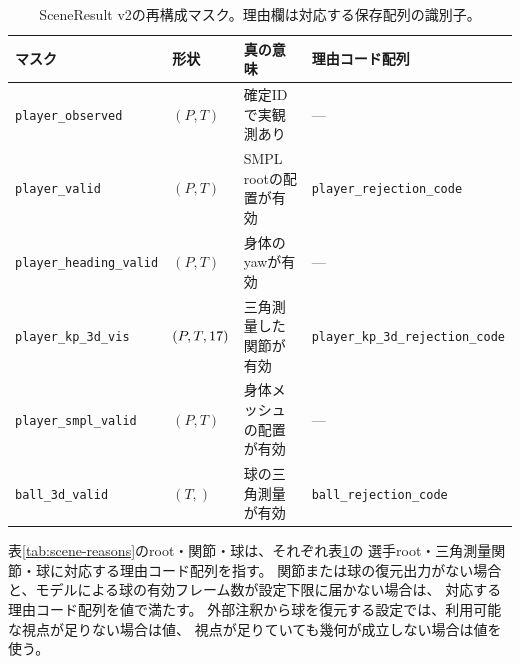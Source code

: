 \begin{table}[htbp]
\centering
\caption{SceneResult v2の再構成マスク。理由欄は対応する保存配列の識別子。}
\label{tab:scene-masks}
\small
\begin{tabular}{@{}llll@{}}
\toprule
マスク & 形状 & 真の意味 & 理由コード配列 \\
\midrule
\texttt{player\_observed} & $(P,T)$ & 確定IDで実観測あり & --- \\
\texttt{player\_valid} & $(P,T)$ & SMPL rootの配置が有効 & \texttt{player\_rejection\_code} \\
\texttt{player\_heading\_valid} & $(P,T)$ & 身体のyawが有効 & --- \\
\texttt{player\_kp\_3d\_vis} & $(P,T,\ev{schema}{17})$ & 三角測量した関節が有効 & \texttt{player\_kp\_3d\_rejection\_code} \\
\texttt{player\_smpl\_valid} & $(P,T)$ & 身体メッシュの配置が有効 & --- \\
\texttt{ball\_3d\_valid} & $(T,)$ & 球の三角測量が有効 & \texttt{ball\_rejection\_code} \\
\bottomrule
\end{tabular}
\end{table}

表\ref{tab:scene-reasons}のroot・関節・球は、それぞれ表\ref{tab:scene-masks}の
選手root・三角測量関節・球に対応する理由コード配列を指す。
関節または球の復元出力がない場合と、モデルによる球の有効フレーム数が設定下限に届かない場合は、
対応する理由コード配列を値で満たす。
外部注釈から球を復元する設定では、利用可能な視点が足りない場合は値、
視点が足りていても幾何が成立しない場合は値を使う。

